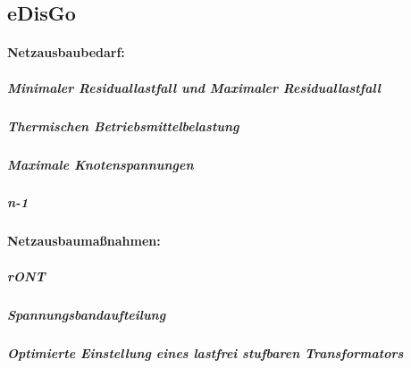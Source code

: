\subsection{eDisGo}\label{chap:edisgo_theo}

\paragraph{Netzausbaubedarf:}


\subparagraph{Minimaler Residuallastfall und Maximaler Residuallastfall}

\subparagraph{Thermischen Betriebsmittelbelastung}

\subparagraph{Maximale Knotenspannungen}


\subparagraph{n-1}

\paragraph{Netzausbaumaßnahmen:}


\subparagraph{rONT}



\subparagraph{Spannungsbandaufteilung}

\subparagraph{Optimierte Einstellung eines lastfrei stufbaren Transformators}